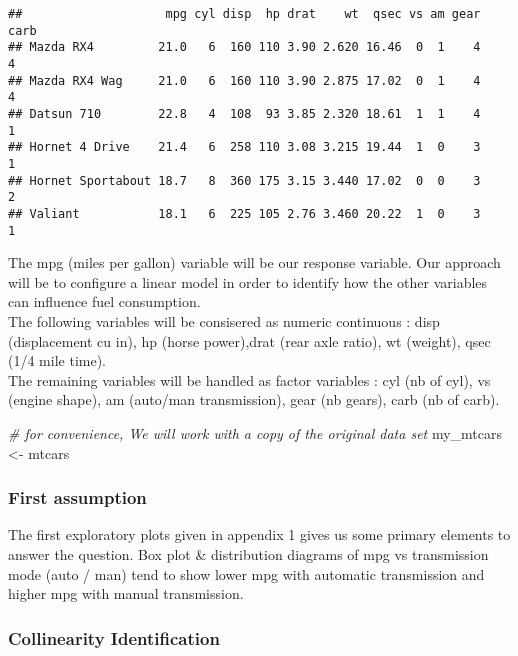 \documentclass[
]{article}
\newenvironment{Shaded}{\begin{snugshade}}{\end{snugshade}}
\newcommand{\CommentTok}[1]{\textcolor[rgb]{0.56,0.35,0.01}{\textit{#1}}}
\newcommand{\NormalTok}[1]{#1}
\newcommand{\StringTok}[1]{\textcolor[rgb]{0.31,0.60,0.02}{#1}}
\begin{document}
\begin{verbatim}
##                    mpg cyl disp  hp drat    wt  qsec vs am gear carb
## Mazda RX4         21.0   6  160 110 3.90 2.620 16.46  0  1    4    4
## Mazda RX4 Wag     21.0   6  160 110 3.90 2.875 17.02  0  1    4    4
## Datsun 710        22.8   4  108  93 3.85 2.320 18.61  1  1    4    1
## Hornet 4 Drive    21.4   6  258 110 3.08 3.215 19.44  1  0    3    1
## Hornet Sportabout 18.7   8  360 175 3.15 3.440 17.02  0  0    3    2
## Valiant           18.1   6  225 105 2.76 3.460 20.22  1  0    3    1
\end{verbatim}

The mpg (miles per gallon) variable will be our response variable. Our
approach will be to configure a linear model in order to identify how
the other variables can influence fuel consumption.\\
The following variables will be consisered as numeric continuous : disp
(displacement cu in), hp (horse power),drat (rear axle ratio), wt
(weight), qsec (1/4 mile time).\\
The remaining variables will be handled as factor variables : cyl (nb of
cyl), vs (engine shape), am (auto/man transmission), gear (nb gears),
carb (nb of carb).\\

\begin{Shaded}
\begin{Highlighting}[]
\CommentTok{# for convenience, We will work with a copy of the original data set}
\NormalTok{my_mtcars <-}\StringTok{ }\NormalTok{mtcars}
\end{Highlighting}
\end{Shaded}

\hypertarget{first-assumption}{%
\subsubsection{First assumption}\label{first-assumption}}

The first exploratory plots given in appendix 1 gives us some primary
elements to answer the question. Box plot \& distribution diagrams of
mpg vs transmission mode (auto / man) tend to show lower mpg with
automatic transmission and higher mpg with manual transmission.\\

\hypertarget{collinearity-identification}{%
\subsubsection{Collinearity
Identification}\label{collinearity-identification}}
\end{document}
